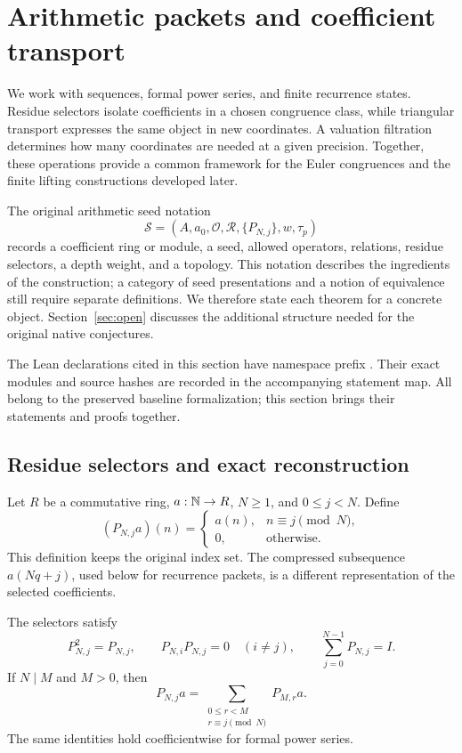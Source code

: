 \section{Arithmetic packets and coefficient transport}
\label{sec:foundations}

We work with sequences, formal power series, and finite recurrence states.
Residue selectors isolate coefficients in a chosen congruence class, while
triangular transport expresses the same object in new coordinates. A valuation
filtration determines how many coordinates are needed at a given precision.
Together, these operations provide a common framework for the Euler
congruences and the finite lifting constructions developed later.

The original arithmetic seed notation
\[
\mathcal S=(A,a_0,\mathcal O,\mathcal R,\{P_{N,j}\},w,\tau_p)
\]
records a coefficient ring or module, a seed, allowed operators, relations,
residue selectors, a depth weight, and a topology. This notation describes the
ingredients of the construction; a category of seed presentations and a
notion of equivalence still require separate definitions. We therefore state
each theorem for a concrete object. Section~\ref{sec:open} discusses the
additional structure needed for the original native conjectures.

The Lean declarations cited in this section have namespace prefix
. Their exact modules and source hashes are recorded in
the accompanying statement map. All belong to the preserved baseline
formalization; this section brings their statements and proofs together.

\subsection{Residue selectors and exact reconstruction}

Let $R$ be a commutative ring, $a:\mathbb N\to R$, $N\geq1$, and $0\leq j<N$.
Define
\[
(P_{N,j}a)(n)=
\begin{cases}
a(n),&n\equiv j\pmod N,\\
0,&\text{otherwise}.
\end{cases}
\]
This definition keeps the original index set. The compressed subsequence
$a(Nq+j)$, used below for recurrence packets, is a different representation of
the selected coefficients.

\begin{theorem}
\label{thm:residue-reconstruction}
The selectors satisfy
\[
P_{N,j}^2=P_{N,j},\qquad P_{N,i}P_{N,j}=0\quad(i\ne j),
\qquad \sum_{j=0}^{N-1}P_{N,j}=I.
\]
If $N\mid M$ and $M>0$, then
\[
P_{N,j}a=\sum_{\substack{0\leq r<M\\r\equiv j\pmod N}}P_{M,r}a.
\]
The same identities hold coefficientwise for formal power series.
\end{theorem}

